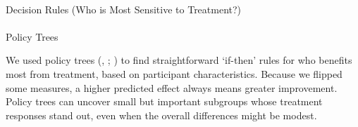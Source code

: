 \documentclass[
  single column]{article}
\makeatletter
\let\oldparagraph\paragraph
\renewcommand{\paragraph}{
    \@ifstar
      \xxxParagraphStar
      \xxxParagraphNoStar
  }
\newcommand{\xxxParagraphStar}[1]{\oldparagraph*{#1}\mbox{}}
\newcommand{\xxxParagraphNoStar}[1]{\oldparagraph{#1}\mbox{}}
\makeatother
\begin{document}
\newpage{}

\paragraph{Decision Rules (Who is Most Sensitive to
Treatment?)}\label{decision-rules-who-is-most-sensitive-to-treatment}

\paragraph{Policy Trees}\label{policy-trees}

We used policy trees (,
;
) to find
straightforward `if-then' rules for who benefits most from treatment,
based on participant characteristics. Because we flipped some measures,
a higher predicted effect always means greater improvement. Policy trees
can uncover small but important subgroups whose treatment responses
stand out, even when the overall differences might be modest.
\end{document}
